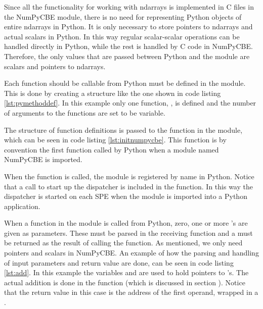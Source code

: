 
Since all the functionality for working with ndarrays is implemented
in C files in the NumPyCBE module, there is no need for representing
Python objects of entire ndarrays in Python. It is only necessary to
store pointers to ndarrays and actual scalars in Python. In this way
regular scalar-scalar operations can be handled directly in Python,
while the rest is handled by C code in NumPyCBE. Therefore, the only
values that are passed between Python and the module are scalars and
pointers to ndarrays.

Each function should be callable from Python must be defined in the
module.  This is done by creating a structure like the one shown in
code listing \ref{lst:pymethoddef}. In this example only one function,
, is defined and the number of arguments to the
functions are set to be variable.

The structure
of function definitions is passed to the  function in the module, which can be seen in code listing \ref{lst:initnumpycbe}.
This function is by convention the first function called by Python when a module named NumPyCBE is imported.


When the  function is called, the module is registered by name in Python.
Notice that a call to start up the dispatcher is included in the function.
In this way the dispatcher is started on each SPE when the  module is imported into a Python application.

When a function in the module is called from Python, zero, one or more
's are given as parameters.  These must be parsed
in the receiving function and a  must be returned
as the result of calling the function.  As mentioned, we only need
pointers and scalars in NumPyCBE. An example of how the parsing and
handling of input parameters and return value are done, can be seen in
code listing \ref{lst:add}. In this example the variables 
and  are used to hold pointers to
's. The actual addition is done in the
function (which is discussed in section
). Notice that the return value in this case
is the address of the first operand, wrapped in a .


